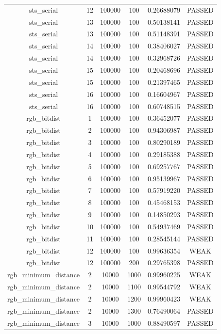 \begin{longtable}{cccccc}
sts\_serial & 12 & 100000 & 100 & 0.26688079 & PASSED \\
sts\_serial & 13 & 100000 & 100 & 0.50138141 & PASSED \\
sts\_serial & 13 & 100000 & 100 & 0.51148391 & PASSED \\
sts\_serial & 14 & 100000 & 100 & 0.38406027 & PASSED \\
sts\_serial & 14 & 100000 & 100 & 0.32968726 & PASSED \\
sts\_serial & 15 & 100000 & 100 & 0.20468696 & PASSED \\
sts\_serial & 15 & 100000 & 100 & 0.21397465 & PASSED \\
sts\_serial & 16 & 100000 & 100 & 0.16604967 & PASSED \\
sts\_serial & 16 & 100000 & 100 & 0.60748515 & PASSED \\
rgb\_bitdist & 1 & 100000 & 100 & 0.36452077 & PASSED \\
rgb\_bitdist & 2 & 100000 & 100 & 0.94306987 & PASSED \\
rgb\_bitdist & 3 & 100000 & 100 & 0.80290189 & PASSED \\
rgb\_bitdist & 4 & 100000 & 100 & 0.29185388 & PASSED \\
rgb\_bitdist & 5 & 100000 & 100 & 0.69257767 & PASSED \\
rgb\_bitdist & 6 & 100000 & 100 & 0.95139967 & PASSED \\
rgb\_bitdist & 7 & 100000 & 100 & 0.57919220 & PASSED \\
rgb\_bitdist & 8 & 100000 & 100 & 0.45468153 & PASSED \\
rgb\_bitdist & 9 & 100000 & 100 & 0.14850293 & PASSED \\
rgb\_bitdist & 10 & 100000 & 100 & 0.54937469 & PASSED \\
rgb\_bitdist & 11 & 100000 & 100 & 0.28545144 & PASSED \\
rgb\_bitdist & 12 & 100000 & 100 & 0.99636354 & WEAK \\
rgb\_bitdist & 12 & 100000 & 200 & 0.29765398 & PASSED \\
rgb\_minimum\_distance & 2 & 10000 & 1000 & 0.99960225 & WEAK \\
rgb\_minimum\_distance & 2 & 10000 & 1100 & 0.99544792 & WEAK \\
rgb\_minimum\_distance & 2 & 10000 & 1200 & 0.99960423 & WEAK \\
rgb\_minimum\_distance & 2 & 10000 & 1300 & 0.76490064 & PASSED \\
rgb\_minimum\_distance & 3 & 10000 & 1000 & 0.88490597 & PASSED \\

\end{longtable}
